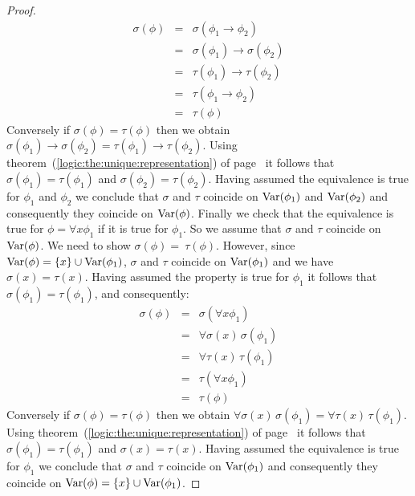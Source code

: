 \begin{proof}
    \begin{eqnarray*}
    \sigma(\phi)&=&\sigma(\phi_{1}\to\phi_{2})\\
    &=&\sigma(\phi_{1})\to\sigma(\phi_{2})\\
    &=&\tau(\phi_{1})\to\tau(\phi_{2})\\
    &=&\tau(\phi_{1}\to\phi_{2})\\
    &=&\tau(\phi)
    \end{eqnarray*}
Conversely if $\sigma(\phi)=\tau(\phi)$ then we obtain
$\sigma(\phi_{1})\to\sigma(\phi_{2})=\tau(\phi_{1})\to\tau(\phi_{2})$.
Using theorem~(\ref{logic:the:unique:representation}) of
page~\pageref{logic:the:unique:representation} it follows that
$\sigma(\phi_{1})=\tau(\phi_{1})$ and
$\sigma(\phi_{2})=\tau(\phi_{2})$. Having assumed the equivalence is
true for $\phi_{1}$ and $\phi_{2}$ we conclude that $\sigma$ and
$\tau$ coincide on $\mbox{\rm Var}(\phi_{1})$ and $\mbox{\rm Var}(\phi_{2})$ and
consequently they coincide on $\mbox{\rm Var}(\phi)$. Finally we check that
the equivalence is true for $\phi=\forall x\phi_{1}$ if it is true
for $\phi_{1}$. So we assume that $\sigma$ and $\tau$ coincide on
$\mbox{\rm Var}(\phi)$. We need to show $\sigma(\phi)=~\tau(\phi)$. However,
since $\mbox{\rm Var}(\phi)=\{x\}\cup\mbox{\rm Var}(\phi_{1})$, $\sigma$ and $\tau$
coincide on $\mbox{\rm Var}(\phi_{1})$ and we have $\sigma(x)=\tau(x)$. Having
assumed the property is true for $\phi_{1}$ it follows that
$\sigma(\phi_{1})=\tau(\phi_{1})$, and consequently:
\begin{eqnarray*}
    \sigma(\phi)&=&\sigma(\forall x\phi_{1})\\
    &=&\forall\sigma(x)\,\sigma(\phi_{1})\\
    &=&\forall\tau(x)\,\tau(\phi_{1})\\
    &=&\tau(\forall x\phi_{1})\\
    &=&\tau(\phi)
    \end{eqnarray*}
Conversely if $\sigma(\phi)=\tau(\phi)$ then we obtain
$\forall\sigma(x)\,\sigma(\phi_{1})=\forall\tau(x)\,\tau(\phi_{1})$.
Using theorem~(\ref{logic:the:unique:representation}) of
page~\pageref{logic:the:unique:representation} it follows that
$\sigma(\phi_{1})=\tau(\phi_{1})$ and $\sigma(x)=\tau(x)$. Having
assumed the equivalence is true for $\phi_{1}$ we conclude that
$\sigma$ and $\tau$ coincide on $\mbox{\rm Var}(\phi_{1})$ and consequently
they coincide on $\mbox{\rm Var}(\phi)=\{x\}\cup\mbox{\rm Var}(\phi_{1})$.
\end{proof}
